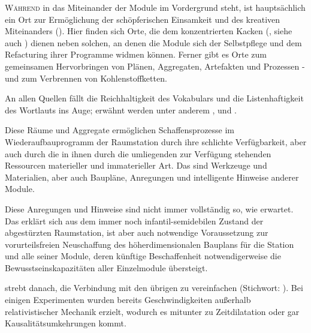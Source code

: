 \begin{newstuff}
   \lettrine{W}{ährend} in  das Miteinander der Module im Vordergrund steht, ist  hauptsächlich ein Ort zur Ermöglichung der schöpferischen Einsamkeit und des kreativen Miteinanders (). Hier finden sich Orte, die dem konzentrierten Kacken (, siehe auch ) dienen neben solchen, an denen die Module sich der Selbstpflege und dem Refacturing ihrer Programme widmen können. Ferner gibt es Orte zum gemeinsamen Hervorbringen von Plänen, Aggregaten, Artefakten und Prozessen - und zum Verbrennen von Kohlenstoffketten. 


   An allen Quellen fällt die Reichhaltigkeit des Vokabulars und die Listenhaftigkeit des Wortlauts ins Auge; erwähnt werden unter anderem ,  und .

    Diese Räume und Aggregate ermöglichen Schaffensprozesse im Wiederaufbauprogramm der Raumstation durch ihre schlichte Verfügbarkeit, aber auch durch die in ihnen durch die umliegenden  zur Verfügung stehenden Ressourcen materieller und immaterieller Art. Das sind Werkzeuge und Materialien, aber auch Baupläne, Anregungen und intelligente Hinweise anderer Module. 

    Diese Anregungen und Hinweise sind nicht immer vollständig so, wie erwartet. Das erklärt sich aus dem immer noch infantil-semidebilen Zustand der abgestürzten Raumstation, ist aber auch notwendige Voraussetzung zur vorurteilsfreien Neuschaffung des höherdimensionalen Bauplans für die Station und alle seiner Module, deren künftige Beschaffenheit notwendigerweise die Bewusstseinskapazitäten aller Einzelmodule übersteigt.

     strebt danach, die Verbindung mit den übrigen  zu vereinfachen (Stichwort: ). Bei einigen Experimenten wurden bereits Geschwindigkeiten außerhalb relativistischer Mechanik erzielt, wodurch es mitunter zu Zeitdilatation oder gar Kausalitätsumkehrungen kommt. 
    


\end{newstuff}
